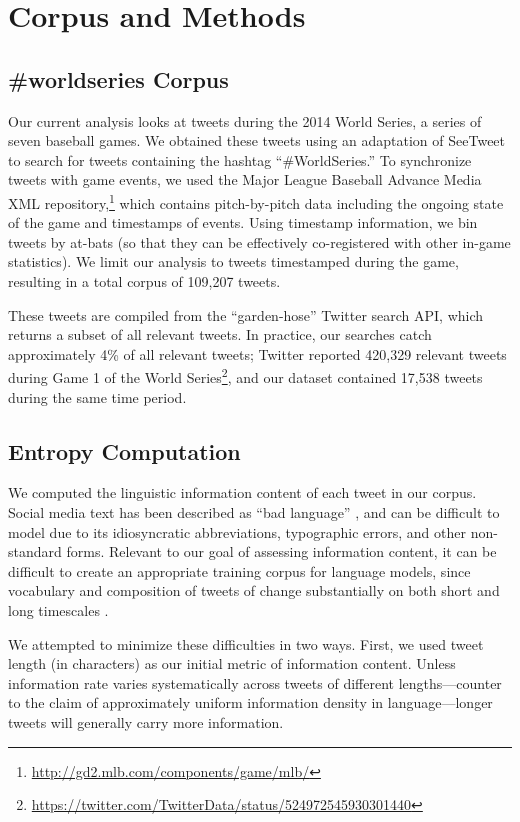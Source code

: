 \documentclass[11pt,letterpaper]{article}
\begin{document}
\section{Corpus and Methods}

\subsection{\#worldseries Corpus}

Our current analysis looks at tweets during the 2014 World Series, a series of seven baseball games.  We obtained these tweets using an adaptation of SeeTweet \cite{doyle2014} to search for tweets containing the hashtag ``\#WorldSeries.''  To synchronize tweets with game events, we used the Major League Baseball Advance Media XML repository,\footnote{\url{http://gd2.mlb.com/components/game/mlb/}} which contains pitch-by-pitch data including the ongoing state of the game and timestamps of events. Using timestamp information, we bin tweets by at-bats (so that they can be effectively co-registered with other in-game statistics).  We limit our analysis to tweets timestamped during the game, resulting in a total corpus of 109,207 tweets.

These tweets are compiled from the ``garden-hose'' Twitter search API, which returns a subset of all relevant tweets. In practice, our searches catch approximately 4\% of all relevant tweets; Twitter reported 420,329 relevant tweets during Game 1 of the World Series\footnote{\url{https://twitter.com/TwitterData/status/524972545930301440}}, and our dataset contained 17,538 tweets during the same time period.

\subsection{Entropy Computation}

We computed the linguistic information content of each tweet in our corpus. Social media text has been described as ``bad language'' \cite{eisenstein2013}, and can be difficult to model due to its idiosyncratic abbreviations, typographic errors, and other non-standard forms. Relevant to our goal of assessing information content, it can be difficult to create an appropriate training corpus for language models, since vocabulary and composition of tweets of change substantially on both short and long timescales \cite{eisenstein2013}.

We attempted to minimize these difficulties in two ways.  First, we used tweet length (in characters) as our initial metric of information content. Unless information rate varies systematically across tweets of different lengths---counter to the claim of approximately uniform information density in language\cite{genzel2002,levy2007}---longer tweets will generally carry more information.
\end{document}
